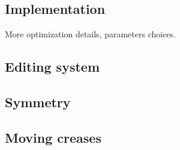 \subsection{Implementation}
More optimization details, parameters choices.
\subsection{Editing system}
\subsection{Symmetry}
\subsection{Moving creases}